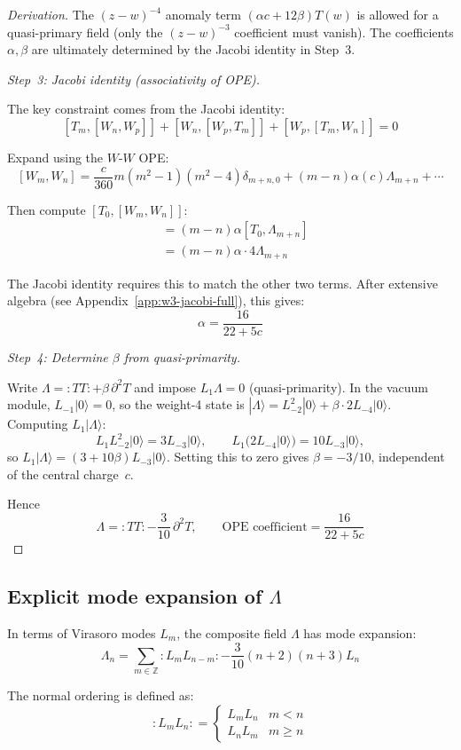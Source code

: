 \begin{proof}[Derivation]
The $(z-w)^{-4}$ anomaly term $(\alpha c + 12\beta)T(w)$ is allowed for a quasi-primary field (only the $(z-w)^{-3}$ coefficient must vanish).  The coefficients $\alpha, \beta$ are ultimately determined by the Jacobi identity in Step~3.

\emph{Step~3: Jacobi identity (associativity of OPE).}

The key constraint comes from the Jacobi identity:
\[[T_m, [W_n, W_p]] + [W_n, [W_p, T_m]] + [W_p, [T_m, W_n]] = 0\]

Expand using the $W$-$W$ OPE:
\[[W_m, W_n] = \frac{c}{360}m(m^2-1)(m^2-4)\delta_{m+n,0} 
+ (m-n)\alpha(c)\Lambda_{m+n} + \cdots\]

Then compute $[T_0, [W_m, W_n]]$:
\begin{align}
[T_0, (m-n)\alpha \Lambda_{m+n}] &= (m-n)\alpha [T_0, \Lambda_{m+n}] \\
&= (m-n)\alpha \cdot 4\Lambda_{m+n}
\end{align}

The Jacobi identity requires this to match the other two terms. After extensive 
algebra (see Appendix~\ref{app:w3-jacobi-full}), this gives:
\[\alpha = \frac{16}{22 + 5c}\]

\emph{Step~4: Determine $\beta$ from quasi-primarity.}

Write $\Lambda = {:}TT{:} + \beta\,\partial^2 T$ and impose $L_1 \Lambda = 0$
(quasi-primarity).  In the vacuum module, $L_{-1}|0\rangle = 0$, so the
weight-4 state is $|\Lambda\rangle = L_{-2}^2|0\rangle + \beta \cdot 2L_{-4}|0\rangle$.
Computing $L_1|\Lambda\rangle$:
\[
L_1 L_{-2}^2|0\rangle = 3L_{-3}|0\rangle, \qquad
L_1(2L_{-4}|0\rangle) = 10L_{-3}|0\rangle,
\]
so $L_1|\Lambda\rangle = (3 + 10\beta)L_{-3}|0\rangle$.  Setting this to zero
gives $\beta = -3/10$, independent of the central charge~$c$.

Hence
\[\Lambda = :TT: - \frac{3}{10}\,\partial^2 T, \qquad
\text{OPE coefficient} = \frac{16}{22+5c}\]
\end{proof}

\subsection{\texorpdfstring{Explicit mode expansion of $\Lambda$}{Explicit mode expansion of}}
\label{subsec:lambda-mode-expansion}

\begin{proposition}\label{prop:lambda-modes}
In terms of Virasoro modes $L_m$, the composite field $\Lambda$ has mode expansion:
\begin{equation}
\Lambda_n = \sum_{m \in \mathbb{Z}} :L_m L_{n-m}:
- \frac{3}{10} (n+2)(n+3) L_n
\end{equation}

The normal ordering is defined as:
\begin{equation}
:L_m L_n: = 
\begin{cases}
L_m L_n & m < n \\
L_n L_m & m \geq n
\end{cases}
\end{equation}
\end{proposition}

